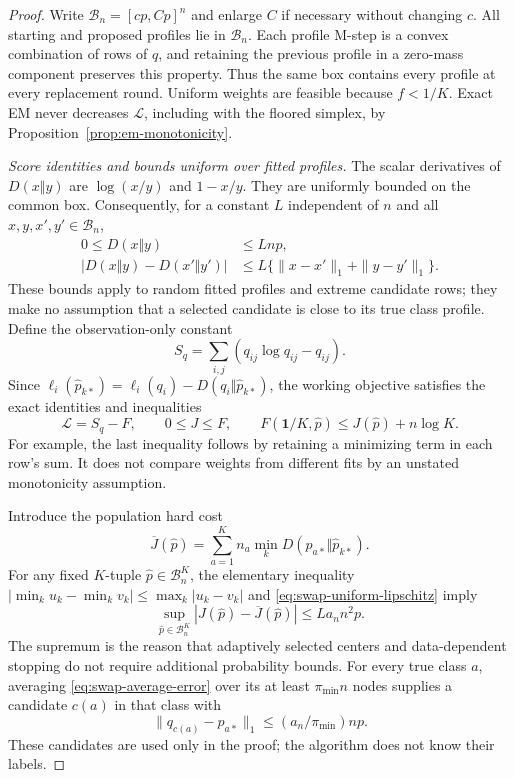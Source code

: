 \begin{proof}
Write $\mathcal B_n=[cp,Cp]^n$ and enlarge $C$ if
necessary without changing $c$. All starting and proposed profiles lie
in $\mathcal B_n$. Each profile M-step is a convex combination of rows
of $q$, and retaining the previous profile in a zero-mass component
preserves this property. Thus the same box contains every profile at
every replacement round. Uniform weights are feasible because
$f<1/K$. Exact EM never decreases $\mathcal L$, including with the
floored simplex, by Proposition~\ref{prop:em-monotonicity}.

\emph{Score identities and bounds uniform over fitted profiles.}
The scalar derivatives of $D(x\Vert y)$ are $\log(x/y)$ and
$1-x/y$. They are uniformly bounded on the common box. Consequently,
for a constant $L$ independent of $n$ and all $x,y,x',y'\in\mathcal B_n$,
\begin{align}
 0\le D(x\Vert y)&\le Lnp,
 \label{eq:swap-bounded-divergence}\\
 |D(x\Vert y)-D(x'\Vert y')|
 &\le L\{\|x-x'\|_1+\|y-y'\|_1\}.
 \label{eq:swap-uniform-lipschitz}
\end{align}
These bounds apply to random fitted profiles and extreme candidate rows;
they make no assumption that a selected candidate is close to its true
class profile. Define the observation-only constant
\[
 S_q=\sum_{i,j}(q_{ij}\log q_{ij}-q_{ij}).
\]
Since $\ell_i(\widehat p_{k*})=\ell_i(q_i)-D(q_i\Vert\widehat p_{k*})$,
the working objective satisfies the exact identities and inequalities
\begin{equation}
 \mathcal L=S_q-F,\qquad
 0\le J\le F,\qquad
 F(\mathbf1/K,\widehat p)\le J(\widehat p)+n\log K.
 \label{eq:swap-saturation-identities}
\end{equation}
For example, the last inequality follows by retaining a minimizing
term in each row's sum. It does not compare weights from different
fits by an unstated monotonicity assumption.

Introduce the population hard cost
\[
 \overline J(\widehat p)=
 \sum_{a=1}^K n_a\min_kD(p_{a*}\Vert\widehat p_{k*}).
\]
For any fixed $K$-tuple $\widehat p\in\mathcal B_n^K$, the elementary
inequality $|\min_k u_k-\min_k v_k|\le\max_k|u_k-v_k|$ and
\eqref{eq:swap-uniform-lipschitz} imply
\begin{equation}
 \sup_{\widehat p\in\mathcal B_n^K}
 |J(\widehat p)-\overline J(\widehat p)|
 \le La_n n^2p.
 \label{eq:swap-uniform-population-approximation}
\end{equation}
The supremum is the reason that adaptively selected centers and
data-dependent stopping do not require additional probability bounds.
For every true class $a$, averaging \eqref{eq:swap-average-error} over
its at least $\pi_{\min}n$ nodes supplies a candidate $c(a)$ in that
class with
\begin{equation}
 \|q_{c(a)}-p_{a*}\|_1
 \le (a_n/\pi_{\min})np.
 \label{eq:swap-existing-good-candidate}
\end{equation}
These candidates are used only in the proof; the algorithm does not
know their labels.


\end{proof}
